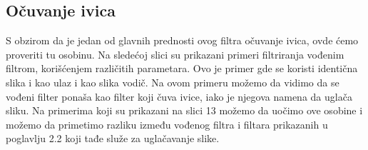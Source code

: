 \documentclass[a4paper,12pt,titlepage]{article}
\begin{document}
\subsection{Očuvanje ivica}%

S obzirom da je jedan od glavnih prednosti ovog filtra očuvanje ivica, ovde ćemo proveriti tu osobinu. Na sledećoj slici su prikazani primeri filtriranja vođenim filtrom, korišćenjem različitih parametara. Ovo je primer gde se koristi identična slika i kao ulaz i kao slika vodič. Na ovom primeru možemo da vidimo da se vođeni filter ponaša kao filter koji čuva ivice, iako je njegova namena da uglača sliku. 
Na primerima koji su prikazani na slici 13 možemo da uočimo ove osobine i možemo da primetimo razliku između vođenog filtra i filtara prikazanih u poglavlju 2.2 koji tađe služe za uglačavanje slike.
\end{document}
